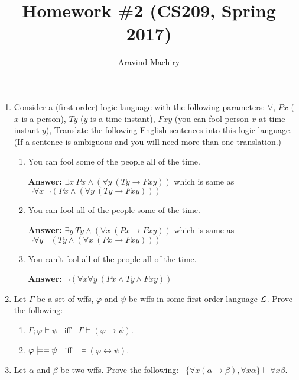 \documentclass[12pt,letterpaper]{article}
\title{\bf Homework \#2\vspace*{-5mm} (CS209, Spring 2017)}
\author{\normalsize Aravind Machiry}
\date{\vspace*{-1cm}}
\def\Emodels{\models\hspace*{-3pt}{=}\hspace*{-6pt}\mid}
\begin{document}
\maketitle
\thispagestyle{empty}
\begin{enumerate}
\item
  Consider a (first-order) logic language with the following parameters:
  $\forall$,
  $Px$ ($x$ is a person),
  $Ty$ ($y$ is a time instant),
  $Fxy$ (you can fool person $x$ at time instant $y$),
  Translate the following English sentences
  into this logic language.
  (If a sentence is ambiguous and you will need
  more than one translation.)
  \vspace*{-2mm}
  \begin{enumerate}\itemsep 0pt
  \item You can fool some of the people all of the time.

\textbf{Answer:}
$\exists x\ Px \land (\forall y\ (Ty \rightarrow Fxy))$ which is same as $\neg \forall x\ \neg (Px \land (\forall y\ (Ty \rightarrow Fxy)))$
  
  \item You can fool all of the people some of the time.

\textbf{Answer:}
$\exists y\ Ty \land (\forall x\ (Px \rightarrow Fxy))$ which is same as $\neg \forall y\ \neg (Ty \land (\forall x\ (Px \rightarrow Fxy)))$
  
  \item You can't fool all of the people all of the time.
  
  \textbf{Answer:}
  $\neg (\forall x \forall y\ (Px \land Ty \land Fxy))$
  \end{enumerate}

\item
  Let $\Gamma$ be a set of wffs,
  $\varphi$ and $\psi$ be wffs
  in some first-order language $\cal L$.
  Prove the following:
  \vspace*{-2mm}
  \begin{enumerate}\itemsep 0pt
  \item
    $\Gamma;\varphi\models\psi$ ~iff~
    $\Gamma\models(\varphi\rightarrow\psi)$.
  \item
    $\varphi\Emodels\psi$ ~iff~
    $\models(\varphi\leftrightarrow\psi)$.
  \end{enumerate}

\item
  Let $\alpha$ and $\beta$ be two wffs.
  Prove the following:~
  $\{\forall x(\alpha\rightarrow\beta), \forall x \alpha\}
  \models \forall x \beta$.


\end{enumerate}
\end{document}
